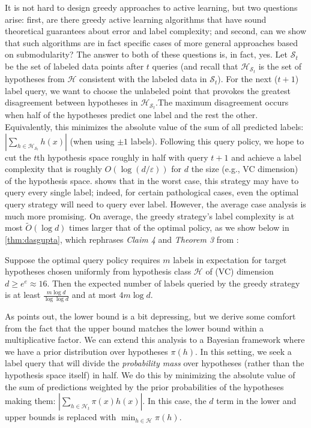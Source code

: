 It is not hard to design greedy approaches to active learning, but two questions arise: first, are there greedy active learning algorithms that have sound theoretical guarantees about error and label complexity; and second, can we show that such algorithms are in fact specific cases of more general approaches based on submodularity? The answer to both of these questions is, in fact, yes. Let $\mathcal{S}_t$ be the set of labeled data points after $t$ queries (and recall that $\mathcal{H}_{\mathcal{S}_t}$ is the set of hypotheses from $\mathcal{H}$ consistent with the labeled data in $\mathcal{S}_t$). For the next ($t+1$) label query, we want to choose the unlabeled point that provokes the greatest disagreement between hypotheses in $\mathcal{H}_{\mathcal{S}_t}$.The maximum disagreement occurs when half of the hypotheses predict one label and the rest the other. Equivalently, this minimizes the absolute value of the sum of all predicted labels: $| \sum_{h \in \mathcal{H}_{\mathcal{S}_t}} h(x)|$ (when using $\pm1$ labels). Following this query policy, we hope to cut the $t$th hypothesis space roughly in half with query $t+1$ and achieve a label complexity that is roughly $O(\log (d/\varepsilon))$ for $d$ the size (e.g., VC dimension) of the hypothesis space. \cite{Dasgupta:2004} shows that in the worst case, this strategy may have to query every single label; indeed, for certain pathological cases, even the optimal query strategy will need to query ever label. However, the average case analysis is much more promising. On average, the greedy strategy's label complexity is at most $\widetilde{O}(\log d)$ times larger that of the optimal policy, as we show below in \ref{thm:dasgupta}, which rephrases \textit{Claim 4} and \textit{Theorem 3} from \cite{Dasgupta:2004}:\\

\begin{theorem}\label{thm:dasgupta}
Suppose the optimal query policy requires $m$ labels in expectation for target hypotheses chosen uniformly from hypothesis class $\mathcal{H}$ of (VC) dimension $d \geq e^e \approx 16$. Then the expected number of labels queried by the greedy strategy is at least $\frac{m \log d}{\log \log d}$ and at most $4 m \log d$.
\end{theorem}

As \cite{Dasgupta:2004} points out, the lower bound is a bit depressing, but we derive some comfort from the fact that the upper bound matches the lower bound within a multiplicative factor. We can extend this analysis to a Bayesian framework where we have a prior distribution over hypotheses $\pi(h)$. In this setting, we seek a label query that will divide the \textit{probability mass} over hypotheses (rather than the hypothesis space itself) in half. We do this by minimizing the absolute value of the sum of predictions weighted by the prior probabilities of the hypotheses making them: $| \sum_{h \in \mathcal{H}_t} \pi(x) h(x)|$. In this case, the $d$ term in the lower and upper bounds is replaced with $\min_{h \in \mathcal{H}} \pi(h)$.

